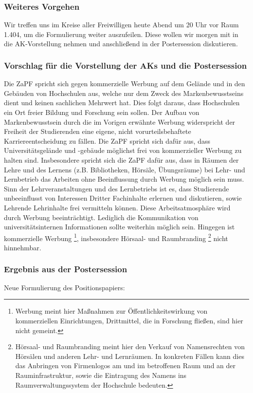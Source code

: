 		\subsubsection*{Weiteres Vorgehen}
			Wir treffen uns im Kreise aller Freiwilligen heute Abend um 20 Uhr vor Raum 1.404, um die Formulierung weiter auszufeilen. Diese wollen wir morgen mit in die AK-Vorstellung nehmen und anschließend in der Postersession diskutieren.

		\subsubsection*{Vorschlag für die Vorstellung der AKs und die Postersession}
			Die ZaPF spricht sich gegen kommerzielle Werbung auf dem Gelände und in den Gebäuden von Hochschulen aus, welche nur dem Zweck des Markenbewusstseins dient und keinen sachlichen Mehrwert hat. Dies folgt daraus, dass Hochschulen ein Ort freier Bildung und Forschung sein sollen.
			Der Aufbau von Markenbewusstsein durch die im Vorigen erwähnte Werbung widerspricht der Freiheit der Studierenden eine eigene, nicht vorurteilsbehaftete Karriereentscheidung zu fällen.
			Die ZaPF spricht sich dafür aus, dass Universitätsgelände und -gebäude möglichst frei von kommerzieller Werbung zu halten sind.
			Insbesondere spricht sich die ZaPF dafür aus, dass in Räumen der Lehre und des Lernens (z.B. Bibliotheken, Hörsäle, Übungsräume) bei Lehr- und Lernbetrieb das Arbeiten ohne Beeinflussung durch Werbung möglich sein muss. Sinn der Lehrveranstaltungen und des Lernbetriebs ist es, dass Studierende unbeeinflusst von Interessen Dritter Fachinhalte erlernen und diskutieren, sowie Lehrende Lehrinhalte frei vermitteln können. Diese Arbeitsatmosphäre wird durch Werbung beeinträchtigt.
			Lediglich die Kommunikation von universitätsinternen Informationen sollte weiterhin möglich sein.
			Hingegen ist kommerzielle Werbung \footnote{Werbung meint hier Maßnahmen zur Öffentlichkeitswirkung von kommerziellen Einrichtungen, Drittmittel, die in Forschung fließen, sind hier nicht gemeint.}, insbesondere Hörsaal- und Raumbranding \footnote{Hörsaal- und Raumbranding meint hier den Verkauf von Namensrechten von Hörsälen und anderen Lehr- und Lernräumen. In konkreten Fällen kann dies das Anbringen von Firmenlogos am und im betroffenen Raum und an der Rauminfrastruktur, sowie die Eintragung des Namens ins Raumverwaltungssystem der Hochschule bedeuten.} nicht hinnehmbar.

		\subsubsection*{Ergebnis aus der Postersession}
			Neue Formulierung des Positionspapiers:

